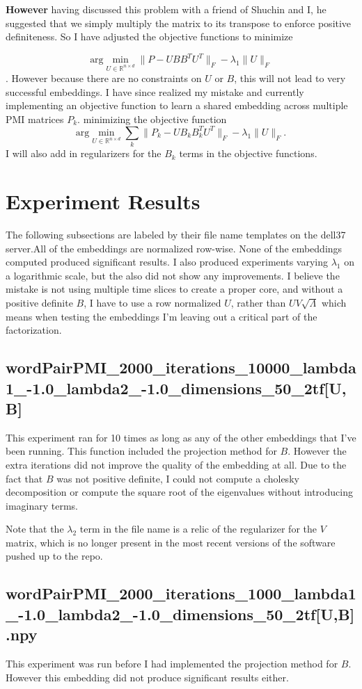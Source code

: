 \documentclass{report}
\newcommand{\argmin}[2]{\text{arg}\min_{#1}#2}
\begin{document}
	\textbf{However} having discussed this problem with a friend of Shuchin and I, he suggested that we simply multiply the matrix to its transpose to enforce positive definiteness. So I have adjusted the objective functions to minimize 
	
	\[ 
	\argmin{U \in \mathbb{R}^{n \times d}}{\|P - UBB^TU^T\|_{F} - \lambda_1\|U\|_{F}}
	\].
	However because there are no constraints on $ U $ or $ B $, this will not lead to very successful embeddings. I have since realized my mistake and currently implementing an objective function to learn a shared embedding across multiple PMI matrices $ P_k $. minimizing the objective function 
	\[ 
	  \argmin{U \in \mathbb{R}^{n \times d}}\displaystyle \sum_{k}{\|P_k} - UB_kB_k^TU^T\|_{F} - \lambda_1\|U\|_{F}.
	\]
	I will also add in regularizers for the $ B_k $ terms in the objective functions. 
	
	
	\section{Experiment Results}
	The following subsections are labeled by their file name templates on the dell37 server.All of the embeddings are normalized row-wise. None of the embeddings computed produced significant results. 
	I also produced experiments varying $ \lambda_1 $ on a logarithmic scale, but the also did not show any improvements. I believe the mistake is not using multiple time slices to create a proper core, and without a positive definite $ B $, I have to use a row normalized $ U $, rather than $ UV\sqrt{\Lambda} $ which means when testing the embeddings I'm leaving out a critical part of the factorization. 
	\subsection{wordPairPMI\_2000\_iterations\_10000\_lambda1\_-1.0\_lambda2\_-1.0\_dimensions\_50\_2tf[U,B]}
	  This experiment ran for 10 times as long as any of the other embeddings that I've been running. This function included the projection method for $ B $. However the extra iterations did not improve the quality of the embedding at all. Due to the fact that $ B $ was not positive definite, I could not compute a cholesky decomposition or compute the square root of the eigenvalues without introducing imaginary terms. 
	  
	   Note that the $ \lambda_2 $ term in the file name is a relic of the regularizer for the $ V $ matrix, which is no longer present in the most recent versions of the software pushed up to the repo. 
	   
	\subsection{wordPairPMI\_2000\_iterations\_1000\_lambda1\_-1.0\_lambda2\_-1.0\_dimensions\_50\_2tf[U,B].npy}
	  This experiment was run before I had implemented the projection method for $ B $. However this embedding did not produce significant results either. 
	 
	 
\end{document}
